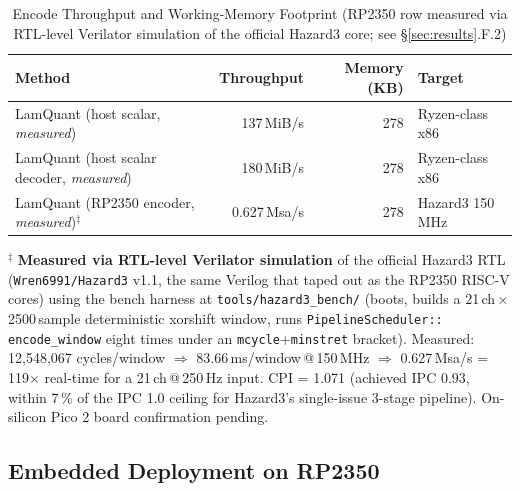 \documentclass[journal]{IEEEtran}
\begin{document}
\begin{table}[!t]
\renewcommand{\arraystretch}{1.3}
\caption{Encode Throughput and Working-Memory Footprint
(RP2350 row measured via RTL-level Verilator simulation of the
official Hazard3 core; see \S\ref{sec:results}.F.2)}
\label{tab:speed-mem}
\centering
\begin{tabular}{lrrl}
\toprule
Method & Throughput & Memory (KB) & Target \\
\midrule
LamQuant (host scalar, \emph{measured}) & 137\,MiB/s & 278 & Ryzen-class x86 \\
LamQuant (host scalar decoder, \emph{measured}) & 180\,MiB/s & 278 & Ryzen-class x86 \\
LamQuant (RP2350 encoder, \emph{measured})$^\ddagger$ & 0.627\,Msa/s & 278 & Hazard3 150\,MHz \\
\bottomrule
\end{tabular}

\vspace{0.4em}
\noindent\parbox{0.95\textwidth}{\scriptsize $^\ddagger$ \textbf{Measured via
RTL-level Verilator simulation} of the official Hazard3 RTL
(\texttt{Wren6991/Hazard3} v1.1, the same Verilog that taped out
as the RP2350 RISC-V cores) using the bench harness at
\texttt{tools/hazard3\_bench/} (boots, builds a 21\,ch\,$\times$\,2500\,sample
deterministic xorshift window, runs \texttt{PipelineScheduler::
encode\_window} eight times under an \texttt{mcycle}+\texttt{minstret}
bracket). Measured: 12{,}548{,}067 cycles/window
$\Rightarrow$ 83.66\,ms/window\,@\,150\,MHz $\Rightarrow$
0.627\,Msa/s = 119$\times$ real-time for a 21\,ch\,@\,250\,Hz
input. CPI = 1.071 (achieved IPC 0.93, within 7\,\% of the IPC
1.0 ceiling for Hazard3's single-issue 3-stage pipeline).
On-silicon Pico 2 board confirmation pending.}
\end{table}

\subsection{Embedded Deployment on RP2350}
\noindent{}
\end{document}
